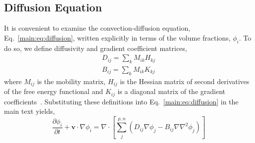 \documentclass[journal=mamobx,manuscript=suppinfo]{achemso}
\begin{document}
\subsection{Diffusion Equation}
It is convenient to examine the convection-diffusion equation, Eq.~\ref{main:eq:diffusion}, written explicitly in terms of the volume fractions, $\phi_{i}$.
To do so, we define diffusivity and gradient coefficient matrices,
\begin{gather}
D_{ij} = \sum_{k} M_{ik} H_{kj} \\
B_{ij} = \sum_{k} M_{ik} K_{kj} 
\end{gather}
where $M_{ij}$ is the mobility matrix, $H_{ij}$ is the Hessian matrix of second derivatives of the free energy functional and $K_{ij}$ is a diagonal matrix of the gradient coefficients~\cite{Tree2017}.
Substituting these definitions into Eq.~\ref{main:eq:diffusion} in the main text yields,
\begin{equation}
  \frac{\partial \phi_{i}}{\partial t} + \bm{v} \cdot \nabla \phi_{i} =
    \nabla \cdot \left [ \sum_{j}^{p,n} \left ( D_{ij} \nabla \phi_{j} 
    - B_{ij} \nabla \nabla^{2} \phi_{j} \right ) \right ] \label{eq:diffusion}
\end{equation}
\end{document}
